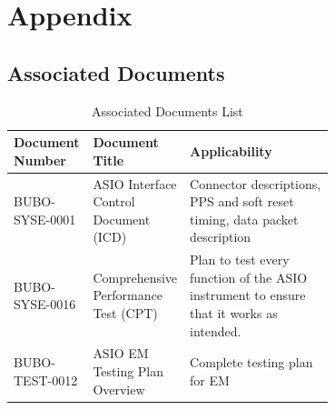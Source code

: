 
\newpage
\section{Appendix}

\subsection{Associated Documents}

\begin{table}[H]
	\centering
	\caption{Associated Documents List}
	\begin{tabular}[t]{l>{\raggedright}p{0.25\linewidth}>{\raggedright\arraybackslash}p{0.45\linewidth}}
		\toprule
		\textbf{Document Number} & \textbf{Document Title} & \textbf{Applicability}\\
	\midrule
        BUBO-SYSE-0001 & ASIO Interface Control Document (ICD) & Connector descriptions, PPS and soft reset timing, data packet description  \\
        \midrule
        BUBO-SYSE-0016 & Comprehensive Performance Test (CPT) & Plan to test every function of the ASIO instrument to ensure that it works as intended. \\
        \midrule
        BUBO-TEST-0012 & ASIO EM Testing Plan Overview &  Complete testing plan for EM \\
		\bottomrule
	\end{tabular}
\end{table}

